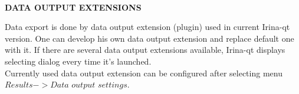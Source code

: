\documentclass[a4paper]{article}
\begin{document}
\hypertarget{dataexport}{\\}
\begin{center}\textbf{DATA OUTPUT EXTENSIONS}\end{center}
{
Data export is done by data output extension (plugin) used in current Irina-qt version.
One can develop his own data output extension and replace default one with it.
If there are several data output extensions available, Irina-qt displays selecting dialog every time it's launched.
\\
Currently used data output extension can be configured after selecting menu $Results->Data$ $output$ $settings$.
}
\end{document}
